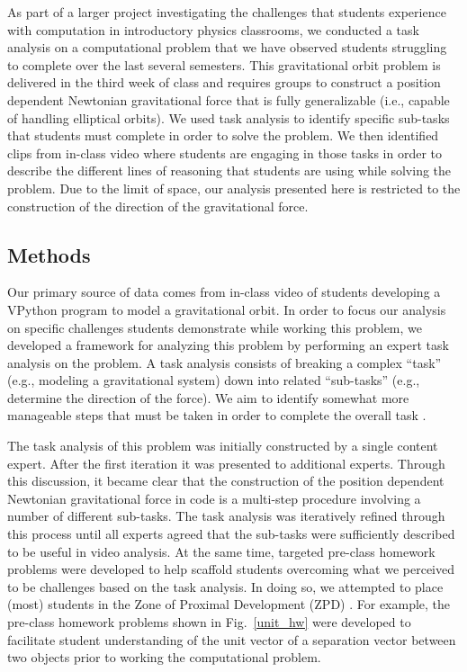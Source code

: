 \documentclass{msuphddissertation}
\begin{document}
\begin{doublespace}
As part of a larger project investigating the challenges that students experience with computation in introductory physics classrooms, we conducted a task analysis on a computational problem that we have observed students struggling to complete over the last several semesters.  This gravitational orbit problem is delivered in the third week of class and requires groups to construct a position dependent Newtonian gravitational force that is fully generalizable (i.e., capable of handling elliptical orbits).  We used task analysis to identify specific sub-tasks that students must complete in order to solve the problem. We then identified clips from in-class video where students are engaging in those tasks in order to describe the different lines of reasoning that students are using while solving the problem. Due to the limit of space, our analysis presented here is restricted to the construction of the direction of the gravitational force.

\subsection{Methods}\label{methods}

Our primary source of data comes from in-class video of students developing a VPython program to model a gravitational orbit. In order to focus our analysis on specific challenges students demonstrate while working this problem, we developed a framework for analyzing this problem by performing an expert task analysis on the problem.  A task analysis consists of breaking a complex ``task'' (e.g., modeling a gravitational system) down into related ``sub-tasks'' (e.g., determine the direction of the force). We aim to identify somewhat more manageable steps that must be taken in order to complete the overall task \cite{catra}.

The task analysis of this problem was initially constructed by a single content expert. After the first iteration it was presented to additional experts. Through this discussion, it became clear that the construction of the position dependent Newtonian gravitational force in code is a multi-step procedure involving a number of different sub-tasks. The task analysis was iteratively refined through this process until all experts agreed that the sub-tasks were sufficiently described to be useful in video analysis. At the same time, targeted pre-class homework problems were developed to help scaffold students overcoming what we perceived to be challenges based on the task analysis.  In doing so, we attempted to place (most) students in the Zone of Proximal Development (ZPD) \cite{vyg}. For example, the pre-class homework problems shown in Fig.~\ref{unit_hw} were developed to facilitate student understanding of the unit vector of a separation vector between two objects prior to working the computational problem.


\end{doublespace}
\end{document}
